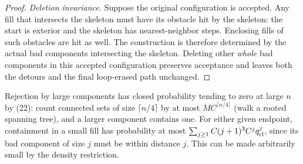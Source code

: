 \begin{proof}
\emph{Deletion invariance.}
Suppose the original configuration is accepted. Any fill that
intersects the skeleton must have its obstacle hit by the
skeleton: the start is exterior and the skeleton has
nearest-neighbor steps. Enclosing fills of such obstacles are
hit as well. The construction is therefore determined by the
actual bad components intersecting the skeleton. Deleting other
\emph{whole} bad components in this accepted configuration
preserves acceptance and leaves both the detours and the final
loop-erased path unchanged.
\end{proof}

Rejection by large components has closed probability tending to zero at large \(n\) by (22): count connected sets of size \(\lceil n/4\rceil\) by at most \(M C^{\lceil n/4\rceil}\) (walk a rooted spanning tree), and a larger component contains one. For either given endpoint, containment in a small fill has probability at most \(\sum_{j\ge1} C(j+1)^3 C^j q_{\rm cl}^j\), since its bad component of size \(j\) must be within distance \(j\). This can be made arbitrarily small by the density restriction.
